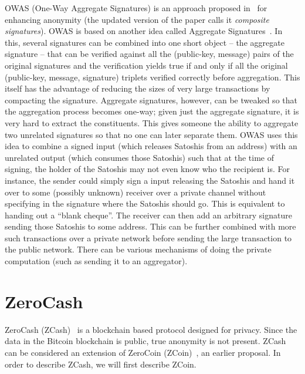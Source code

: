 \documentclass[]{report}   %
\begin{document}
OWAS (One-Way Aggregate Signatures) is an approach proposed in~\cite{saxena2014increasing} for enhancing anonymity (the updated version of the paper calls it {\em composite signatures}). OWAS is based on another idea called Aggregate Signatures~\cite{boneh2003aggregate}. In this, several signatures can be combined into one short object -- the aggregate signature -- that can be verified against all the (public-key, message) pairs of the original signatures and the verification yields true if and only if all the original (public-key, message, signature) triplets verified correctly before aggregation. This itself has the advantage of reducing the sizes of very large transactions by compacting the signature. Aggregate signatures, however, can be tweaked so that the aggregation process becomes one-way; given just the aggregate signature, it is very hard to extract the constituents. This gives someone the ability to aggregate two unrelated signatures so that no one can later separate them. OWAS uses this idea to combine a signed input (which releases Satoshis from an address) with an unrelated output (which consumes those Satoshis) such that at the time of signing, the holder of the Satoshis may not even know who the recipient is. For instance, the sender could simply sign a input releasing the Satoshis and hand it over to some (possibly unknown) receiver over a private channel without specifying in the signature where the Satoshis should go. This is equivalent to handing out a ``blank cheque''. The receiver can then add an arbitrary signature sending those Satoshis to some address. This can be further combined with more such transactions over a private network before sending the large transaction to the public network. There can be various mechanisms of doing the private computation (such as sending it to an aggregator).


\section{ZeroCash}

ZeroCash (ZCash)~\cite{sasson2014zerocash} is a blockchain based protocol designed for privacy. Since the data in the Bitcoin blockchain is public, true anonymity is not present.
 ZCash can be considered an extension of ZeroCoin (ZCoin)~\cite{miers2013zerocoin}, an earlier proposal. In order to describe ZCash, we will first describe ZCoin.
\end{document}
